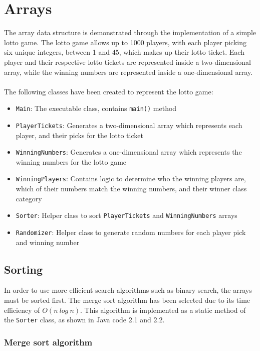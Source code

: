 \newpage
\section{Arrays}

The array data structure is demonstrated through the implementation of a simple lotto game. The lotto game allows up to 1000 players, with each player picking six unique integers, between 1 and 45, which makes up their lotto ticket. Each player and their respective lotto tickets are represented inside a two-dimensional array, while the winning numbers are represented inside a one-dimensional array.
\\
\\
The following classes have been created to represent the lotto game:

\begin{itemize}
\item \texttt{Main}: The executable class, contains \texttt{main()} method
\item \texttt{PlayerTickets}: Generates a two-dimensional array which represents each player, and their picks for the lotto ticket
\item \texttt{WinningNumbers}: Generates a one-dimensional array which represents the winning numbers for the lotto game
\item \texttt{WinningPlayers}: Contains logic to determine who the winning players are, which of their numbers match the winning numbers, and their winner class category
\item \texttt{Sorter}: Helper class to sort \texttt{PlayerTickets} and \texttt{WinningNumbers} arrays
\item \texttt{Randomizer}: Helper class to generate random numbers for each player pick and winning number
\end{itemize}

\subsection{Sorting}

In order to use more efficient search algorithms such as binary search, the arrays must be sorted first. The merge sort algorithm has been selected due to its time efficiency of $O(n \ log \ n)$. This algorithm is implemented as a static method of the \texttt{Sorter} class, as shown in Java code 2.1 and 2.2.

\subsubsection{Merge sort algorithm}

